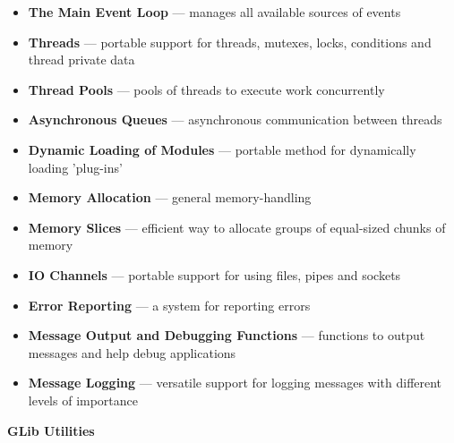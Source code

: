 \documentclass[12pt]{article}
\begin{document}
\begin{itemize}
\begin{itemize}
\item \textbf{The Main Event Loop} — manages all available sources of events
\item \textbf{Threads} — portable support for threads, mutexes, locks, conditions and thread private data
\item \textbf{Thread Pools} — pools of threads to execute work concurrently
\item \textbf{Asynchronous Queues} — asynchronous communication between threads
\item \textbf{Dynamic Loading of Modules} — portable method for dynamically loading 'plug-ins'
\item \textbf{Memory Allocation} — general memory-handling
\item \textbf{Memory Slices} — efficient way to allocate groups of equal-sized chunks of memory
\item \textbf{IO Channels} — portable support for using files, pipes and sockets
\item \textbf{Error Reporting} — a system for reporting errors
\item \textbf{Message Output and Debugging Functions} — functions to output messages and help debug applications
\item \textbf{Message Logging} — versatile support for logging messages with different levels of importance




\end{itemize}

\clearpage

\textbf{GLib Utilities}
\begin{itemize}



\end{itemize}
\end{itemize}
\end{document}

